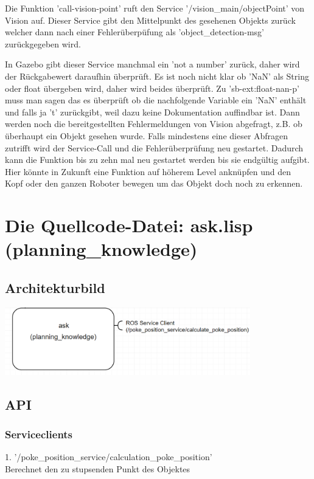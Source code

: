 \documentclass{suturo}
\begin{document}
Die Funktion 'call-vision-point' ruft den Service '/vision\_main/objectPoint' von Vision auf. Dieser Service gibt den Mittelpunkt des gesehenen Objekts zurück welcher dann nach einer Fehlerüberpüfung als 'object\_detection-msg' zurückgegeben wird. 

In Gazebo gibt dieser Service manchmal ein 'not a number' zurück, daher wird der Rückgabewert daraufhin überprüft. Es ist noch nicht klar ob 'NaN' als String oder float übergeben wird, daher wird beides überprüft. Zu 'sb-ext:float-nan-p' muss man sagen das es überprüft ob die nachfolgende Variable ein 'NaN' enthält und falls ja 't' zurückgibt, weil dazu keine Dokumentation auffindbar ist. Dann werden noch die bereitgestellten Fehlermeldungen von Vision abgefragt, z.B. ob überhaupt ein Objekt gesehen wurde. Falls mindestens eine dieser Abfragen zutrifft wird der Service-Call und die Fehlerüberprüfung neu gestartet. Dadurch kann die Funktion bis zu zehn mal neu gestartet werden bis sie endgültig aufgibt. Hier könnte in Zukunft eine Funktion auf höherem Level anknüpfen und den Kopf oder den ganzen Roboter bewegen um das Objekt doch noch zu erkennen.




\section{Die Quellcode-Datei: ask.lisp (planning\_knowledge)}
\subsection{Architekturbild}
\begin{center} \includegraphics[width=0.8\textwidth]{img/diag_planning_knowledge.png} \end{center}
\subsection{API}
\subsubsection{Serviceclients}
1. '/poke\_position\_service/calculation\_poke\_position' \\
Berechnet den zu stupsenden Punkt des Objektes
\end{document}
